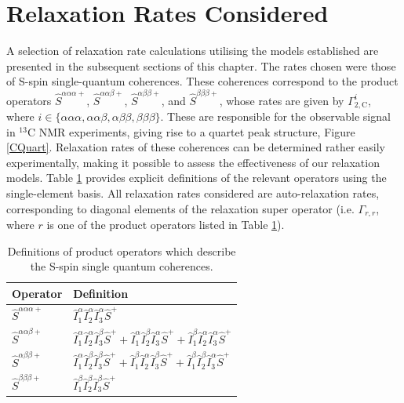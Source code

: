 \section{Relaxation Rates Considered} \label{RatesConsidered}
A selection of relaxation rate calculations utilising the models established are presented in the subsequent sections of this chapter. The rates chosen were those of S-spin single-quantum coherences. These coherences correspond to the product operators $\hat{S}^{\alpha \alpha \alpha +}$, $\hat{S}^{\alpha \alpha \beta +}$, $\hat{S}^{\alpha \beta \beta +}$, and $\hat{S}^{\beta \beta \beta +}$, whose rates are given by $\Gamma_{2,\text{C}}^{i}$, where $i \in \{\alpha \alpha \alpha, \alpha \alpha \beta, \alpha \beta \beta, \beta \beta \beta\}$. These are responsible for the observable signal in $^{13}$C NMR experiments, giving rise to a quartet peak structure, Figure \ref{CQuart}. Relaxation rates of these coherences can be determined rather easily experimentally, making it possible to assess the effectiveness of our relaxation models. Table \ref{Operators} provides explicit definitions of the relevant operators using the single-element basis. All relaxation rates considered are auto-relaxation rates, corresponding to diagonal elements of the relaxation super operator (i.e. $\Gamma_{r,r}$, where $r$ is one of the product operators listed in Table \ref{Operators}).
\begin{table}[]
\centering
\begin{tabular}{l|l}
Operator                           & Definition                                                                                                                                                                                                        \\ \hline
$\hat{S}^{\alpha \alpha \alpha +}$ & $\hat{I}_1^{\alpha} \hat{I}_2^{\alpha} \hat{I}_3^{\alpha} \hat{S}^{+}$                                                                                                                                            \\
$\hat{S}^{\alpha \alpha \beta +}$  & $\hat{I}_1^{\alpha} \hat{I}_2^{\alpha} \hat{I}_3^{\beta} \hat{S}^{+} + \hat{I}_1^{\alpha} \hat{I}_2^{\beta} \hat{I}_3^{\alpha} \hat{S}^{+} + \hat{I}_1^{\beta} \hat{I}_2^{\alpha} \hat{I}_3^{\alpha} \hat{S}^{+}$ \\
$\hat{S}^{\alpha \beta \beta +}$   & $\hat{I}_1^{\alpha} \hat{I}_2^{\beta} \hat{I}_3^{\beta} \hat{S}^{+} + \hat{I}_1^{\beta} \hat{I}_2^{\alpha} \hat{I}_3^{\beta} \hat{S}^{+} + \hat{I}_1^{\beta} \hat{I}_2^{\beta} \hat{I}_3^{\alpha} \hat{S}^{+}$    \\
$\hat{S}^{\beta \beta \beta +}$    & $\hat{I}_1^{\beta} \hat{I}_2^{\beta} \hat{I}_3^{\beta} \hat{S}^{+}$
\end{tabular}
\caption{Definitions of product operators which describe the S-spin single quantum coherences.}
\label{Operators}
\end{table}
